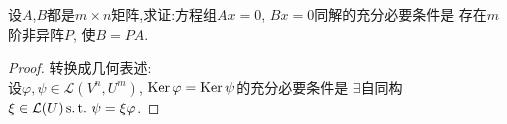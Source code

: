 \begin{example}
  设$A$,$B$都是$m \times n$矩阵,求证:方程组$Ax=0$, $Bx=0$同解的充分必要条件是
  存在$m$阶非异阵$P$, 使$B=PA$.
\end{example}

\begin{proof}
  转换成几何表述:\\
  设$\varphi,\psi \in \mathcal{L}(V^n,U^m)$,
  $\operatorname{Ker}\varphi = \operatorname{Ker}\psi$的充分必要条件是
  $\exists$自同构$\xi \in \mathcal{L}(U) \operatorname{s.t.{}} \psi=\xi\varphi$.
\end{proof}
